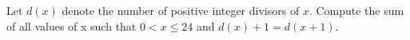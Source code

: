 Let $d(x)$ denote the number of positive integer divisors of $x$. Compute the sum of all values of x such that $0 < x \le 24$ and $d(x) + 1 = d(x + 1)$.
